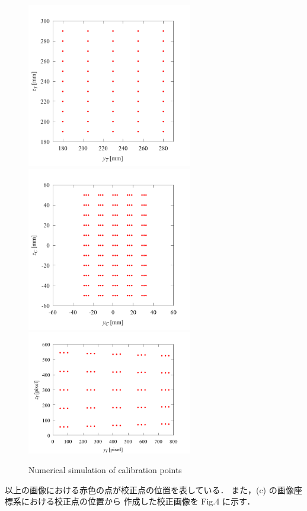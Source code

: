 \documentclass[twocolumn,a4j]{jsarticle}
\begin{document}
\newpage
\begin{figure}[htbp]
  \centering
  {
    \includegraphics[keepaspectratio, width=72mm]{../images/Calibration/calibration_point_for_tank.png}
    \includegraphics[keepaspectratio, width=72mm]{../images/Calibration/calibration_point_for_camera.png}
    \includegraphics[keepaspectratio, width=72mm]{../images/Calibration/calibration_point_for_screen.png}
  }
  \caption{Numerical simulation of calibration points}
\end{figure}

以上の画像における赤色の点が校正点の位置を表している．
また，(c) の画像座標系における校正点の位置から
作成した校正画像を Fig.4 に示す．
\end{document}
